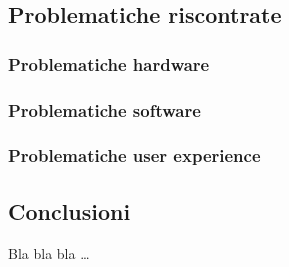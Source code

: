 \documentclass[../Sperimentazione.tex]{subfiles}
\begin{document}
			
		\newpage
			
	
		\newpage
		\subsection{Problematiche riscontrate}
		
			\subsubsection{Problematiche hardware}
		
			\subsubsection{Problematiche software}
		
			\subsubsection{Problematiche user experience}
			
		\newpage
		\subsection{Conclusioni}
			Bla bla bla \dots
\end{document}
